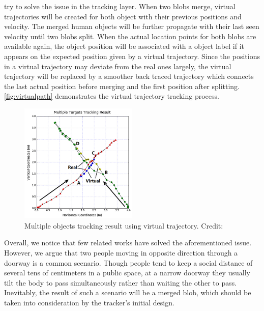 \citeauthor{virtualtrack} \cite{virtualtrack} try to solve the issue in the tracking layer. When two blobs merge, virtual trajectories will be created for both object with their previous positions and velocity. The merged human objects will be further propagate with their last seen velocity until two blobs split. When the actual location points for both blobs are available again, the object position will be associated with a object label if it appears on the expected position given by a virtual trajectory. Since the positions in a virtual trajectory may deviate from the real ones largely, the virtual trajectory will be replaced by a smoother back traced trajectory which connects the last actual position before merging and the first position after splitting. \autoref{fig:virtualpath} demonstrates the virtual trajectory tracking process.
\begin{figure}
  \centering
  \includegraphics[width=0.5\textwidth]{figures/virtualpath.PNG}
  \caption{Multiple objects tracking result using virtual trajectory. Credit: \cite{virtualtrack}}\label{fig:virtualpath}
\end{figure}

Overall, we notice that few related works have solved the aforementioned issue. However, we argue that two people moving in opposite direction through a doorway is a common scenario. Though people tend to keep a social distance of several tens of centimeters in a public space, at a narrow doorway they usually tilt the body to pass simultaneously rather than waiting the other to pass. Inevitably, the result of such a scenario will be a merged blob, which should be taken into consideration by the tracker's initial design.





